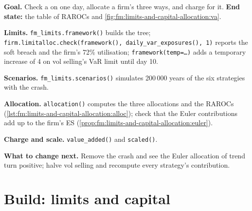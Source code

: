 \begin{tutorial}
\textbf{Goal.} Check a  on one day, allocate a firm's  three ways, and charge for it. \textbf{End state:} the table
of RAROCs and \cref{fig:fm:limits-and-capital-allocation:va}.
\begin{tutsteps}
\item \textbf{Limits.} \texttt{fm\_limits.framework()} builds the tree; \texttt{firm.limitalloc.check(framework(), daily\_var\_exposures(), 1)}
reports the soft breach and the firm's 72\% utilisation; \texttt{framework(temp=\dots)} adds a temporary increase of 4 on vol selling's
VaR limit until day 10.
\item \textbf{Scenarios.} \texttt{fm\_limits.scenarios()} simulates 200\,000 years of the six strategies with the crash.
\item \textbf{Allocation.} \texttt{allocation()} computes the three allocations and the RAROCs (\cref{lst:fm:limits-and-capital-allocation:alloc});
check that the Euler contributions add up to the firm's ES (\cref{prop:fm:limits-and-capital-allocation:euler}).
\item \textbf{Charge and scale.} \texttt{value\_added()} and \texttt{scaled()}.
\end{tutsteps}
\end{tutorial}

\textbf{What to change next.} Remove the crash and see the Euler allocation of trend turn positive; halve vol selling and recompute every
strategy's contribution.

\section{Build: limits and capital}\label{bld:fm:limits-and-capital-allocation:limitalloc}

